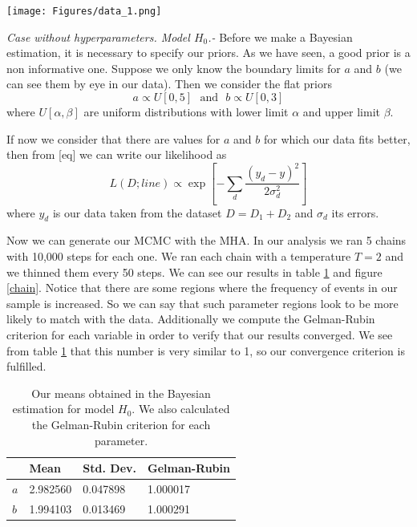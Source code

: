 \documentclass[onecolumn,           %
               showpacs,            %
               preprintnumbers,     %
               aps,                 %
               letterpaper,             %
               superscriptaddress,      %
               nofootinbib,         %
               tightenlines,        %
               floats,floatfix      %
               ,usenatbib,
               ]{revtex4-1}
\begin{document}
\begin{minipage}{\textwidth}
\centering
\texttt{[image: Figures/data\_1.png]}
\label{data_1}
\end{minipage}


\textit{Case without hyperparameters. Model $H_0$.-} Before we make a Bayesian estimation, it is necessary to specify our priors. As we have seen, a good prior is a non informative one. Suppose we only know the boundary limits for $a$ and $b$ (we can see them by eye in our data). Then we consider the flat priors
\begin{equation}
a \propto U[0,5] \ \ \ \text{and} \ \ \ b \propto U[0,3]
\end{equation}
where $U[\alpha,\beta]$ are uniform distributions with lower limit $\alpha$ and upper limit $\beta$.

If now we consider that there are values for $a$ and $b$ for which our data fits better, then from [eq] we can write our likelihood as
\begin{equation}
L(D;line)\propto \exp\left[-\sum_d \frac{(y_d-y)^2}{2\sigma_d^2}\right]
\end{equation}
where $y_d$ is our data taken from the dataset $D=D_1+D_2$ and $\sigma_d$ its errors.

Now we can generate our MCMC with the MHA. In our analysis we ran 5 chains with 10,000 steps for each one. We ran each chain with a temperature $T=2$ and we thinned them every 50 steps. We can see our results in table \ref{tabla1} and figure \ref{chain}. Notice that there are some regions where the frequency of events in our sample is increased. So we can say that such parameter regions look to be more likely to match with the data. Additionally we compute the Gelman-Rubin criterion for each variable in order to verify that our results converged. We see from table \ref{tabla1} that this number is very similar to 1, so our convergence criterion is fulfilled.

\begin{table}[h!]
\centering
\begin{tabular}{||l|l|l|l||} 
 \hline
 & \textbf{Mean} & \textbf{Std. Dev.} & \textbf{Gelman-Rubin} \\ [0.5ex] 
 \hline\hline
$a$ & 2.982560 & 0.047898 & 1.000017 \\
\hline
$b$ & 1.994103 & 0.013469 & 1.000291\\ [1ex] 
 \hline
\end{tabular}
\caption{\footnotesize{Our means obtained in the Bayesian estimation for model $H_0$. We also calculated the Gelman-Rubin criterion for each parameter.}}
\label{tabla1}
\end{table}
\end{document}
